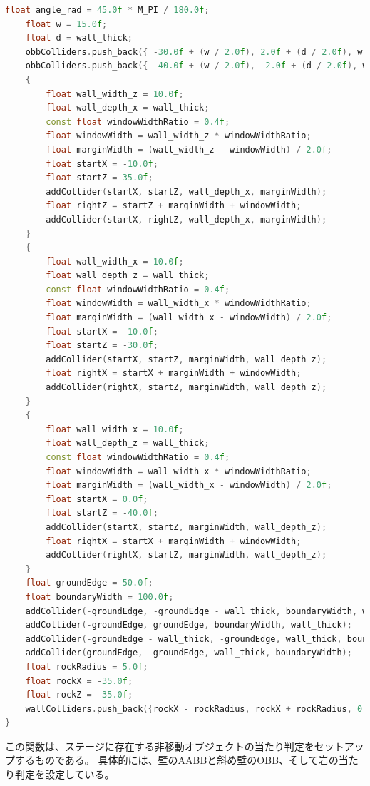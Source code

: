 \documentclass[uplatex,dvipdfmx,a4paper]{jsarticle}
\begin{document}
\begin{lstlisting}[language=C++, caption={setupColliders() 関数}, label={lst:setupColliders_full_detail}]
    float angle_rad = 45.0f * M_PI / 180.0f;
    float w = 15.0f;
    float d = wall_thick;
    obbColliders.push_back({ -30.0f + (w / 2.0f), 2.0f + (d / 2.0f), w / 2.0f, d / 2.0f, angle_rad });
    obbColliders.push_back({ -40.0f + (w / 2.0f), -2.0f + (d / 2.0f), w / 2.0f, d / 2.0f, angle_rad });
    { 
        float wall_width_z = 10.0f;
        float wall_depth_x = wall_thick;
        const float windowWidthRatio = 0.4f;
        float windowWidth = wall_width_z * windowWidthRatio;
        float marginWidth = (wall_width_z - windowWidth) / 2.0f;
        float startX = -10.0f;
        float startZ = 35.0f;
        addCollider(startX, startZ, wall_depth_x, marginWidth);
        float rightZ = startZ + marginWidth + windowWidth;
        addCollider(startX, rightZ, wall_depth_x, marginWidth);
    }
    { 
        float wall_width_x = 10.0f;
        float wall_depth_z = wall_thick;
        const float windowWidthRatio = 0.4f;
        float windowWidth = wall_width_x * windowWidthRatio;
        float marginWidth = (wall_width_x - windowWidth) / 2.0f;
        float startX = -10.0f;
        float startZ = -30.0f;
        addCollider(startX, startZ, marginWidth, wall_depth_z);
        float rightX = startX + marginWidth + windowWidth;
        addCollider(rightX, startZ, marginWidth, wall_depth_z);
    }
    { 
        float wall_width_x = 10.0f;
        float wall_depth_z = wall_thick;
        const float windowWidthRatio = 0.4f;
        float windowWidth = wall_width_x * windowWidthRatio;
        float marginWidth = (wall_width_x - windowWidth) / 2.0f;
        float startX = 0.0f;
        float startZ = -40.0f;
        addCollider(startX, startZ, marginWidth, wall_depth_z);
        float rightX = startX + marginWidth + windowWidth;
        addCollider(rightX, startZ, marginWidth, wall_depth_z);
    }
    float groundEdge = 50.0f;
    float boundaryWidth = 100.0f;
    addCollider(-groundEdge, -groundEdge - wall_thick, boundaryWidth, wall_thick);
    addCollider(-groundEdge, groundEdge, boundaryWidth, wall_thick);
    addCollider(-groundEdge - wall_thick, -groundEdge, wall_thick, boundaryWidth);
    addCollider(groundEdge, -groundEdge, wall_thick, boundaryWidth);
    float rockRadius = 5.0f;
    float rockX = -35.0f;
    float rockZ = -35.0f;
    wallColliders.push_back({rockX - rockRadius, rockX + rockRadius, 0, 0, rockZ - rockRadius, rockZ + rockRadius});
}
\end{lstlisting}
この関数は、ステージに存在する非移動オブジェクトの当たり判定をセットアップするものである。
具体的には、壁のAABBと斜め壁のOBB、そして岩の当たり判定を設定している。
\end{document}
